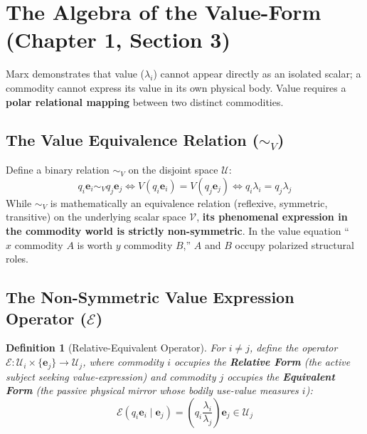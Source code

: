 \documentclass[11pt,a4paper]{article}
\newtheorem{definition}{Definition}[section]
\begin{document}
\section{The Algebra of the Value-Form (Chapter 1, Section 3)}

Marx demonstrates that value ($\lambda_i$) cannot appear directly as an isolated scalar; a commodity cannot express its value in its own physical body. Value requires a \textbf{polar relational mapping} between two distinct commodities.

\subsection{The Value Equivalence Relation ($\sim_V$)}

Define a binary relation $\sim_V$ on the disjoint space $\mathcal{U}$:
\begin{equation}
    q_i \mathbf{e}_i \sim_V q_j \mathbf{e}_j \iff V(q_i \mathbf{e}_i) = V(q_j \mathbf{e}_j) \iff q_i \lambda_i = q_j \lambda_j
\end{equation}
While $\sim_V$ is mathematically an equivalence relation (reflexive, symmetric, transitive) on the underlying scalar space $\mathcal{V}$, \textbf{its phenomenal expression in the commodity world is strictly non-symmetric}. In the value equation ``$x \text{ commodity } A$ is worth $y \text{ commodity } B$,'' $A$ and $B$ occupy polarized structural roles.

\subsection{The Non-Symmetric Value Expression Operator ($\mathcal{E}$)}

\begin{definition}[Relative-Equivalent Operator]
For $i \neq j$, define the operator $\mathcal{E}: \mathcal{U}_i \times \{\mathbf{e}_j\} \to \mathcal{U}_j$, where commodity $i$ occupies the \textbf{Relative Form} (the active subject seeking value-expression) and commodity $j$ occupies the \textbf{Equivalent Form} (the passive physical mirror whose bodily use-value measures $i$):
\begin{equation}
    \mathcal{E}(q_i \mathbf{e}_i \mid \mathbf{e}_j) = \left( q_i \frac{\lambda_i}{\lambda_j} \right) \mathbf{e}_j \in \mathcal{U}_j
\end{equation}
\end{definition}
\end{document}
